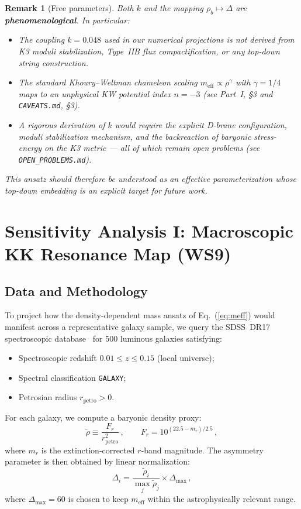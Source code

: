 \documentclass[12pt]{article}
\newtheorem{remark}{Remark}
\begin{document}
\begin{remark}[Free parameters]
\label{rem:free_params}
Both $k$ and the mapping $\rho_b \mapsto \Delta$ are \textbf{phenomenological}.
In particular:
\begin{itemize}
\item The coupling $k = 0.048$ used in our numerical projections is not derived from K3 moduli stabilization, Type~IIB flux compactification, or any top-down string construction.
\item The standard Khoury--Weltman chameleon scaling $m_{\mathrm{eff}} \propto \rho^{\gamma}$ with $\gamma = 1/4$ maps to an unphysical KW potential index $n = -3$ (see Part~I, \S3 and \texttt{CAVEATS.md}, \S3).
\item A rigorous derivation of $k$ would require the explicit D-brane configuration, moduli stabilization mechanism, and the backreaction of baryonic stress-energy on the K3 metric --- all of which remain open problems (see \texttt{OPEN\_PROBLEMS.md}).
\end{itemize}
This ansatz should therefore be understood as an \emph{effective parameterization} whose top-down embedding is an explicit target for future work.
\end{remark}

\section{Sensitivity Analysis I: Macroscopic KK Resonance Map (WS9)}
\label{sec:ws9}

\subsection{Data and Methodology}

To project how the density-dependent mass ansatz of Eq.~(\ref{eq:meff}) would manifest across a representative galaxy sample, we query the SDSS~DR17 spectroscopic database~\cite{sdss_dr17} for 500 luminous galaxies satisfying:
\begin{itemize}
\item Spectroscopic redshift $0.01 \leq z \leq 0.15$ (local universe);
\item Spectral classification \texttt{GALAXY};
\item Petrosian radius $r_{\mathrm{petro}} > 0$.
\end{itemize}
For each galaxy, we compute a baryonic density proxy:
\begin{equation}
\label{eq:density_proxy}
\tilde{\rho} \equiv \frac{F_r}{r_{\mathrm{petro}}^2}\,, \qquad F_r = 10^{(22.5 - m_r)/2.5}\,,
\end{equation}
where $m_r$ is the extinction-corrected $r$-band magnitude.
The asymmetry parameter is then obtained by linear normalization:
\begin{equation}
\label{eq:delta_normalization}
\Delta_i = \frac{\tilde{\rho}_i}{\max_j \tilde{\rho}_j} \times \Delta_{\max}\,,
\end{equation}
where $\Delta_{\max} = 60$ is chosen to keep $m_{\mathrm{eff}}$ within the astrophysically relevant range.
\end{document}
